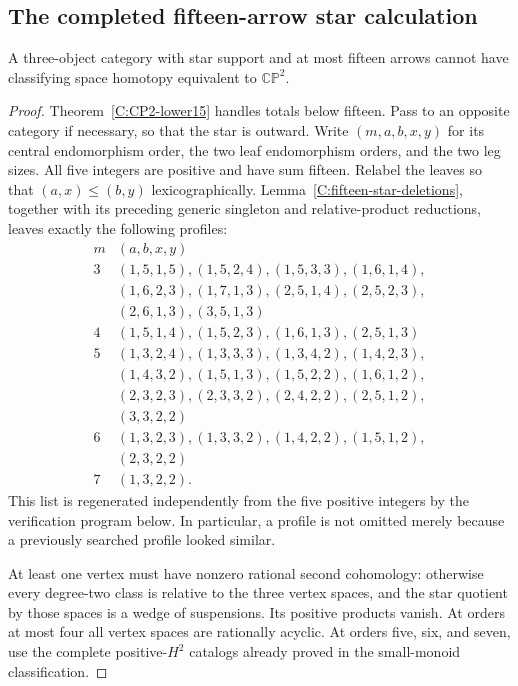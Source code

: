 \subsection{The completed fifteen-arrow star calculation}

\begin{theorem}\label{C:fifteen-all-stars}
A three-object category with star support and at most fifteen
arrows cannot have classifying space homotopy equivalent to
$\mathbb {CP}^2$.
\end{theorem}
\begin{proof}
Theorem~\ref{C:CP2-lower15} handles totals below fifteen.
Pass to an opposite category if necessary, so that the star is
outward.  Write $(m,a,b,x,y)$ for its central endomorphism order,
the two leaf endomorphism orders, and the two leg sizes.  All
five integers are positive and have sum fifteen.  Relabel the
leaves so that $(a,x)\leq(b,y)$ lexicographically.
Lemma~\ref{C:fifteen-star-deletions}, together with its preceding
generic singleton and relative-product reductions, leaves exactly
the following profiles:
\[
\begin{array}{c|l}
m&(a,b,x,y)\\\hline
3&(1,5,1,5),(1,5,2,4),(1,5,3,3),(1,6,1,4),\\
 &(1,6,2,3),(1,7,1,3),(2,5,1,4),(2,5,2,3),\\
 &(2,6,1,3),(3,5,1,3)\\[2pt]
4&(1,5,1,4),(1,5,2,3),(1,6,1,3),(2,5,1,3)\\[2pt]
5&(1,3,2,4),(1,3,3,3),(1,3,4,2),(1,4,2,3),\\
 &(1,4,3,2),(1,5,1,3),(1,5,2,2),(1,6,1,2),\\
 &(2,3,2,3),(2,3,3,2),(2,4,2,2),(2,5,1,2),\\
 &(3,3,2,2)\\[2pt]
6&(1,3,2,3),(1,3,3,2),(1,4,2,2),(1,5,1,2),\\
 &(2,3,2,2)\\[2pt]
7&(1,3,2,2).
\end{array}
\]
This list is regenerated independently from the five positive
integers by the verification program below.  In particular, a
profile is not omitted merely because a previously searched
profile looked similar.

At least one vertex must have nonzero rational second cohomology:
otherwise every degree-two class is relative to the three vertex
spaces, and the star quotient by those spaces is a wedge of
suspensions.  Its positive products vanish.  At orders at most
four all vertex spaces are rationally acyclic.  At orders five,
six, and seven, use the complete positive-$H^2$ catalogs already
proved in the small-monoid classification.


\end{proof}
